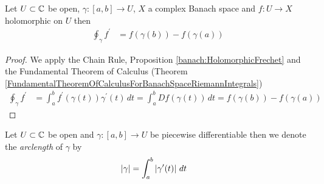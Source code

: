 \begin{prop}\label{banach:FundamentalTheoremOfCalculusForContourIntegrals}Let $U \subset \mathbb{C}$ be open, $\gamma : [a,b] \to U$, $X$ a complex Banach space and $f : U \to X$ holomorphic on $U$ then 
\begin{align*}
\oint_\gamma f^\prime &= f(\gamma(b)) - f(\gamma(a))
\end{align*}
\end{prop}
\begin{proof}
We apply the Chain Rule, Proposition \ref{banach:HolomorphicFrechet} and the Fundamental Theorem of
Calculus (Theorem \ref{FundamentalTheoremOfCalculusForBanachSpaceRiemannIntegrals}) 
\begin{align*}
\oint_\gamma f^\prime &= \int_a^b f^\prime(\gamma(t)) \gamma^\prime(t) \, dt = \int_a^b Df(\gamma(t)) \, dt =  f(\gamma(b)) - f(\gamma(a))
\end{align*}
\end{proof}



\begin{defn}Let $U \subset \mathbb{C}$ be open and $\gamma : [a,b] \to U$ be piecewise differentiable then we denote the \emph{arclength} of $\gamma$ by
  \begin{align*}
    \left \vert \gamma \right \vert &= \int_a^b \left \vert \gamma^\prime(t) \right \vert \, dt
  \end{align*}
\end{defn}

